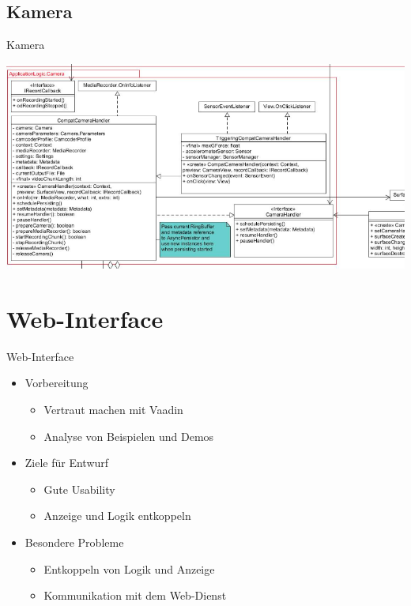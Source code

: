 \documentclass[19pt]{beamer}
\begin{document}
\subsection{Kamera}
\begin{frame}{Kamera}
\begin{center}
\includegraphics[scale=0.3]{resources/camera_new.png}
\end{center}
\end{frame}



\section{Web-Interface}
\begin{frame}{Web-Interface}
    \begin{itemize}
    	\item Vorbereitung
    	\begin{itemize}
			\item Vertraut machen mit Vaadin
			\pause
			\item Analyse von Beispielen und Demos
			\pause
		\end{itemize}
		\item Ziele für Entwurf
		\begin{itemize}
			\item Gute Usability
			\pause
			\item Anzeige und Logik entkoppeln
			\pause
		\end{itemize}
    	\item Besondere Probleme
    	\begin{itemize}
			\item Entkoppeln von Logik und Anzeige
			\pause
			\item Kommunikation mit dem Web-Dienst
		\end{itemize}
    \end{itemize}
\end{frame}
\end{document}
